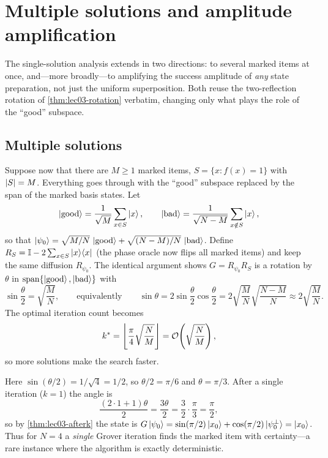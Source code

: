 \section{Multiple solutions and amplitude amplification}
\label{sec:lec03-4}

The single-solution analysis extends in two directions: to several marked items at
once, and---more broadly---to amplifying the success amplitude of \emph{any} state
preparation, not just the uniform superposition. Both reuse the two-reflection
rotation of \cref{thm:lec03-rotation} verbatim, changing only what plays the role of
the ``good'' subspace.

\subsection{Multiple solutions}

Suppose now that there are $M\ge1$ marked items, $S=\{x:f(x)=1\}$ with
$\left\lvert S \right\rvert=M$. Everything goes through with the ``good'' subspace replaced by the
span of the marked basis states. Let
\[
  \ket{\mathrm{good}}=\frac{1}{\sqrt M}\sum_{x\in S}\ket{x},
  \qquad
  \ket{\mathrm{bad}}=\frac{1}{\sqrt{N-M}}\sum_{x\notin S}\ket{x},
\]
so that
$\ket{\psi_0}=\sqrt{M/N}\,\ket{\mathrm{good}}+\sqrt{(N-M)/N}\,\ket{\mathrm{bad}}$.
Define $R_S=\mathbb{I}-2\sum_{x\in S}\ket{x}\!\bra{x}$ (the phase oracle now flips all marked
items) and keep the same diffusion $R_{\psi_0}$. The identical argument shows
$G=R_{\psi_0}R_S$ is a rotation by $\theta$ in
$\operatorname{span}\{\ket{\mathrm{good}},\ket{\mathrm{bad}}\}$ with
\[
  \sin\frac{\theta}{2}=\sqrt{\frac{M}{N}},
  \qquad\text{equivalently}\qquad
  \sin\theta=2\sin\frac{\theta}{2}\cos\frac{\theta}{2}
            =2\sqrt{\frac{M}{N}}\sqrt{\frac{N-M}{N}}\approx 2\sqrt{\frac{M}{N}}.
\]
The optimal iteration count becomes
\[
  k^{\ast}=\left\lfloor\frac{\pi}{4}\sqrt{\frac{N}{M}}\right\rfloor
  =\mathcal{O}\!\left(\sqrt{\frac{N}{M}}\right),
\]
so more solutions make the search faster.

\begin{example}[The exact case $N=4$, $M=1$]
\label{exa:lec03-n4}
Here $\sin(\theta/2)=1/\sqrt4=1/2$, so $\theta/2=\pi/6$ and $\theta=\pi/3$. After a
single iteration ($k=1$) the angle is
\[
  \frac{(2\cdot1+1)\theta}{2}=\frac{3\theta}{2}=\frac{3}{2}\cdot\frac{\pi}{3}=\frac{\pi}{2},
\]
so by \cref{thm:lec03-afterk} the state is
$G\ket{\psi_0}=\sin(\pi/2)\ket{x_0}+\cos(\pi/2)\ket{\psi_0^{\perp}}=\ket{x_0}$.
Thus for $N=4$ a \emph{single} Grover iteration finds the marked item with
certainty---a rare instance where the algorithm is exactly deterministic.
\end{example}

